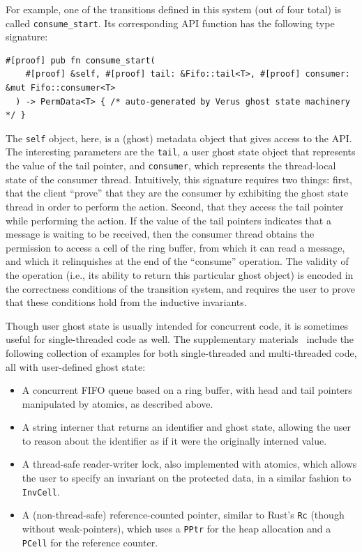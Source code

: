 For example, one of the transitions defined in this system (out of four total)
is called \verb`consume_start`.
Its corresponding API function has the following type signature:
\begin{lstlisting}[language=Verus,style=VerusLineNos]
#[proof] pub fn consume_start(
    #[proof] &self, #[proof] tail: &Fifo::tail<T>, #[proof] consumer: &mut Fifo::consumer<T>
  ) -> PermData<T> { /* auto-generated by Verus ghost state machinery */ }
\end{lstlisting}
The \verb`self` object, here, is a (ghost) metadata object that gives access to the API.
The interesting parameters are the \verb`tail`, a user ghost state object that
represents the value of the tail pointer,
and \verb`consumer`, which represents the thread-local state of the consumer thread.
Intuitively, this signature requires two things:
first, that the client ``prove'' that they are the consumer
by exhibiting the ghost state thread in order to perform the action.
Second, that they access the tail pointer while performing the action.
If the value of the tail pointers indicates that a message is waiting to be received,
then the consumer thread obtains the permission to access
a cell of the ring buffer, from which it can read a message, and which it relinquishes
at the end of the ``consume'' operation.
The validity of the operation (i.e., its ability to return this particular ghost object)
is encoded in the correctness conditions of the transition system,
and \verus requires the user to prove that these conditions hold from the inductive invariants.

Though user ghost state is usually intended for concurrent code, it is sometimes useful
for single-threaded code as well.
The supplementary materials~\cite{verussupplementary} include the following collection of examples for both
single-threaded and multi-threaded code, all with user-defined ghost state:
\begin{itemize}
  \item A concurrent FIFO queue based on a ring buffer, with head and tail pointers manipulated by atomics, as described above.
  \item A string interner that returns an identifier and ghost state, allowing the user to reason about the identifier
      as if it were the originally interned value.
  \item A thread-safe reader-writer lock, also implemented with atomics, which allows the user to specify an invariant on the protected data, in a similar fashion to \verb`InvCell`.
  \item A (non-thread-safe) reference-counted pointer, similar to Rust's \verb`Rc` (though without weak-pointers),
      which uses a \verb`PPtr` for the heap allocation and a \verb`PCell` for the reference counter.
\end{itemize}
